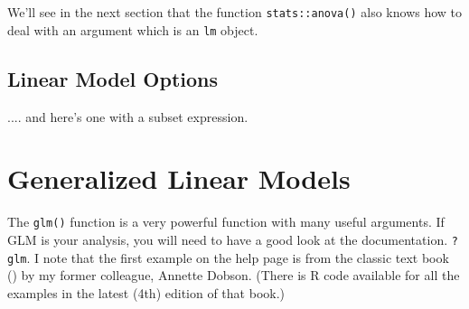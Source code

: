 \documentclass[titlepage]{book}\usepackage{knitr}
\begin{document}
\begin{knitrout}
\color{fgcolor}\begin{kframe}
\begin{alltt}
  
\end{alltt}
\end{kframe}
\end{knitrout}

We'll see in the next section that the function \texttt{stats::anova()} also knows how to deal with an argument which is an \texttt{lm} object.

\begin{knitrout}
\color{fgcolor}\begin{kframe}
\begin{alltt}
 \hlkwb{<-}  \hlopt{~}  \hlopt{+}  \hlopt{+}  \hlopt{+}  \hlopt{+}  \hlopt{+}
   \hlopt{+}  \hlopt{+}   
\end{alltt}
\end{kframe}
\end{knitrout}

\subsection{Linear Model Options}

.... and here's one with a subset expression.

\begin{knitrout}
\color{fgcolor}\begin{kframe}
\begin{alltt}
 \hlkwb{<-}  \hlopt{~}  \hlopt{+}  \hlopt{+}  \hlopt{+}  \hlopt{+}  \hlopt{+}
   \hlopt{+}  \hlopt{+}     \hlopt{==} \hlstd{)}
\end{alltt}
\end{kframe}
\end{knitrout}


\section{Generalized Linear Models}
The \texttt{glm()} function is a very powerful function with many useful arguments. If GLM is your analysis, you will need to have a good look at the documentation.  \texttt{?glm}. I note that the first example on the help page is from the classic text book (\cite{Dobson2018}) by my former colleague, Annette Dobson. (There is R code available for all the examples in the latest (4th) edition of that book.)
\end{document}
